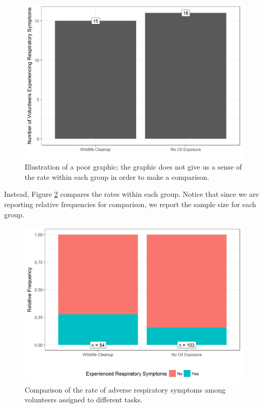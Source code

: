 \documentclass[]{book}
\theoremstyle{definition}
\theoremstyle{definition}
\theoremstyle{remark}
\begin{document}
\begin{figure}

{\centering \includegraphics[width=0.8\linewidth]{./Images/summaries-bad-barchart-1} 

}

\caption{Illustration of a poor graphic; the graphic does not give us a sense of the rate within each group in order to make a comparison.}\label{fig:summaries-bad-barchart}
\end{figure}

Instead, Figure \ref{fig:summaries-good-barchart} compares the rates
within each group. Notice that since we are reporting relative
frequencies for comparison, we report the sample size for each group.

\begin{figure}

{\centering \includegraphics[width=0.8\linewidth]{./Images/summaries-good-barchart-1} 

}

\caption{Comparison of the rate of adverse respiratory symptoms among volunteers assigned to different tasks.}\label{fig:summaries-good-barchart}
\end{figure}
\end{document}

